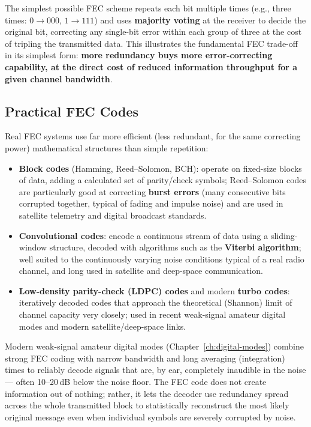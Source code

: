 The simplest possible FEC scheme repeats each bit multiple times (e.g.,
three times: $0 \to 000$, $1 \to 111$) and uses \textbf{majority voting}
at the receiver to decide the original bit, correcting any single-bit
error within each group of three at the cost of tripling the
transmitted data. This illustrates the fundamental FEC trade-off in its
simplest form: \textbf{more redundancy buys more error-correcting
capability, at the direct cost of reduced information throughput for a
given channel bandwidth}.

\subsection{Practical FEC Codes}

Real FEC systems use far more efficient (less redundant, for the same
correcting power) mathematical structures than simple repetition:

\begin{itemize}
\item \textbf{Block codes} (Hamming, Reed--Solomon, BCH): operate on
fixed-size blocks of data, adding a calculated set of parity/check
symbols; Reed--Solomon codes are particularly good at correcting
\textbf{burst errors} (many consecutive bits corrupted together, typical
of fading and impulse noise) and are used in satellite telemetry and
digital broadcast standards.
\item \textbf{Convolutional codes}: encode a continuous stream of data
using a sliding-window structure, decoded with algorithms such as the
\textbf{Viterbi algorithm}; well suited to the continuously varying
noise conditions typical of a real radio channel, and long used in
satellite and deep-space communication.
\item \textbf{Low-density parity-check (LDPC) codes} and modern
\textbf{turbo codes}: iteratively decoded codes that approach the
theoretical (Shannon) limit of channel capacity very closely; used in
recent weak-signal amateur digital modes and modern satellite/deep-space
links.
\end{itemize}

\begin{keyidea}
Modern weak-signal amateur digital modes (Chapter~\ref{ch:digital-modes})
combine strong FEC coding with narrow bandwidth and long averaging
(integration) times to reliably decode signals that are, by ear,
completely inaudible in the noise --- often 10--20\,dB below the noise
floor. The FEC code does not create information out of nothing; rather,
it lets the decoder use redundancy spread across the whole transmitted
block to statistically reconstruct the most likely original message
even when individual symbols are severely corrupted by noise.
\end{keyidea}

